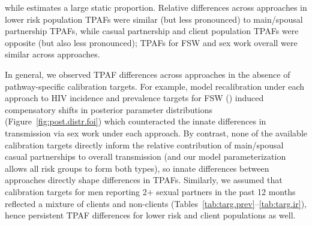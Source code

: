 while \ird estimates a large static proportion.
Relative differences across approaches in lower risk population TPAFs were
similar (but less pronounced) to main/spousal partnership TPAFs, while
casual partnership and client population TPAFs were
opposite (but also less pronounced);
TPAFs for FSW and sex work overall were similar across approaches.
\par
In general, we observed TPAF differences across approaches
in the absence of pathway-specific calibration targets.
For example, model recalibration under each approach to
HIV incidence and prevalence targets for FSW ()
induced compensatory shifts in posterior parameter distributions
(Figure~\ref{fig:post.distr.foi})
which counteracted the innate differences in
transmission via sex work under each approach.
By contrast, none of the available calibration targets directly inform
the relative contribution of main/spousal \vs casual partnerships to overall transmission
(and our model parameterization allows all risk groups to form both types),
so innate differences between approaches directly shape differences in TPAFs.
Similarly, we assumed that calibration targets for
men reporting 2+ sexual partners in the past 12 months
reflected a mixture of clients and non-clients
(Tables~\ref{tab:targ.prev}--\ref{tab:targ.ir}),
hence persistent TPAF differences for lower risk and client populations as well.
